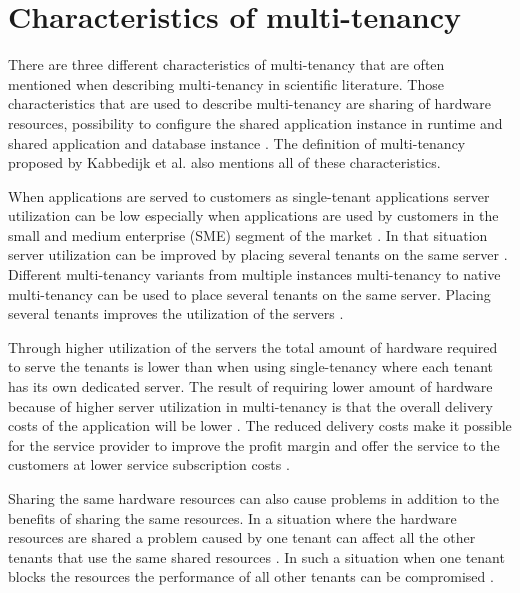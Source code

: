 \documentclass[conference]{sasmoota2017}
\begin{document}
\section{Characteristics of multi-tenancy}

There are three different characteristics of multi-tenancy that are often mentioned when describing multi-tenancy in scientific literature. Those characteristics that are used to describe multi-tenancy are sharing of hardware resources, possibility to configure the shared application instance in runtime and shared application and database instance \cite{Bezemer:2010:MaintenanceDream}. The definition of multi-tenancy proposed by Kabbedijk et al. \cite{Kabbedijk2015:Defining} also mentions all of these characteristics. 

When applications are served to customers as single-tenant applications server utilization can be low especially when applications are used by customers in the small and medium enterprise (SME) segment of the market \cite{Bezemer:2010:MaintenanceDream}. In that situation server utilization can be improved by placing several tenants on the same server \cite{Bezemer:2010:MaintenanceDream}. Different multi-tenancy variants from multiple instances multi-tenancy to native multi-tenancy can be used to place several tenants on the same server. Placing several tenants improves the utilization of the servers \cite{Bezemer:2010:MaintenanceDream}. 

Through higher utilization of the servers the total amount of hardware required to serve the tenants is lower than when using single-tenancy where each tenant has its own dedicated server. The result of requiring lower amount of hardware because of higher server utilization in multi-tenancy is that the overall delivery costs of the application will be lower \cite{Bezemer:2010:MaintenanceDream}. The reduced delivery costs make it possible for the service provider to improve the profit margin and offer the service to the customers at lower service subscription costs \cite{Guo:2007:FrameworkForNative}.

Sharing the same hardware resources can also cause problems in addition to the benefits of sharing the same resources. In a situation where the hardware resources are shared a problem caused by one tenant can affect all the other tenants that use the same shared resources \cite{Bezemer:2010:EnablingMultiTenancy}. In such a situation when one tenant blocks the resources the performance of all other tenants can be compromised \cite{Bezemer:2010:MaintenanceDream}. 
\end{document}
